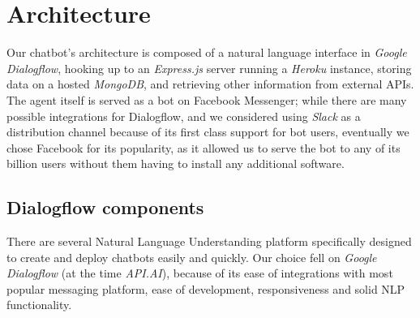 \section{Architecture}
Our chatbot's architecture is composed of a natural language interface in \textit{Google Dialogflow}, hooking up to an \textit{Express.js} server running a \textit{Heroku} instance, storing data on a hosted \textit{MongoDB}, and retrieving other information from external APIs. The agent itself is served as a bot on Facebook Messenger; while there are many possible integrations for Dialogflow, and we considered using \textit{Slack} as a distribution channel because of its first class support for bot users, eventually we chose Facebook for its popularity, as it allowed us to serve the bot to any of its billion users without them having to install any additional software.
\subsection{Dialogflow components}
There are several Natural Language Understanding platform specifically designed to create and deploy chatbots easily and quickly. Our choice fell on \textit{Google Dialogflow} (at the time \textit{API.AI}), because of its ease of integrations with most popular messaging platform, ease of development, responsiveness and solid NLP functionality. 

